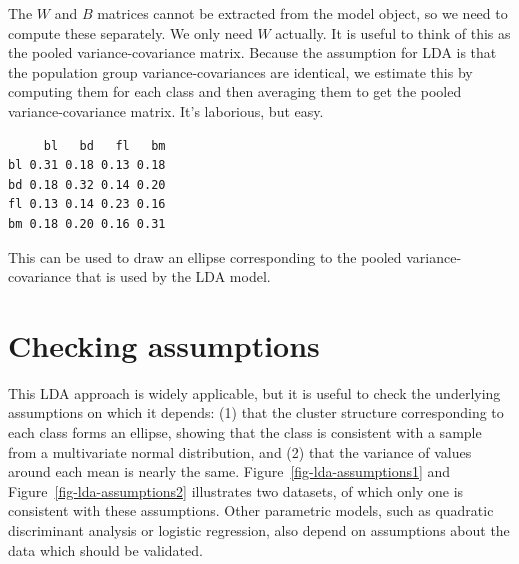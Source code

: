 \documentclass[
  letterpaper,
]{krantz}
\newenvironment{Shaded}{\begin{snugshade}}{\end{snugshade}}
\newcommand{\CommentTok}[1]{\textcolor[rgb]{0.37,0.37,0.37}{#1}}
\newcommand{\DecValTok}[1]{\textcolor[rgb]{0.68,0.00,0.00}{#1}}
\newcommand{\FunctionTok}[1]{\textcolor[rgb]{0.28,0.35,0.67}{#1}}
\newcommand{\NormalTok}[1]{\textcolor[rgb]{0.00,0.23,0.31}{#1}}
\newcommand{\OtherTok}[1]{\textcolor[rgb]{0.00,0.23,0.31}{#1}}
\newcommand{\SpecialCharTok}[1]{\textcolor[rgb]{0.37,0.37,0.37}{#1}}
\begin{document}
The \(W\) and \(B\) matrices cannot be extracted from the model object,
so we need to compute these separately. We only need \(W\) actually. It
is useful to think of this as the pooled variance-covariance matrix.
Because the assumption for LDA is that the population group
variance-covariances are identical, we estimate this by computing them
for each class and then averaging them to get the pooled
variance-covariance matrix. It's laborious, but easy.

\begin{Shaded}
\end{Shaded}

\begin{verbatim}
     bl   bd   fl   bm
bl 0.31 0.18 0.13 0.18
bd 0.18 0.32 0.14 0.20
fl 0.13 0.14 0.23 0.16
bm 0.18 0.20 0.16 0.31
\end{verbatim}

This can be used to draw an ellipse corresponding to the pooled
variance-covariance that is used by the LDA model.

\section{Checking assumptions}\label{checking-assumptions}

This LDA approach is widely applicable, but it is useful to check the
underlying assumptions on which it depends: (1) that the cluster
structure corresponding to each class forms an ellipse, showing that the
class is consistent with a sample from a multivariate normal
distribution, and (2) that the variance of values around each mean is
nearly the same. Figure~\ref{fig-lda-assumptions1} and
Figure~\ref{fig-lda-assumptions2} illustrates two datasets, of which
only one is consistent with these assumptions. Other parametric models,
such as quadratic discriminant analysis or logistic regression, also
depend on assumptions about the data which should be validated.
\end{document}

